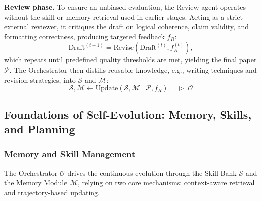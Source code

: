 \documentclass{opendatalab}
\begin{document}
\noindent\textbf{Review phase.}
To ensure an unbiased evaluation, the Review agent operates without the skill or memory retrieval used in earlier stages. Acting as a strict external reviewer, it critiques the draft on logical coherence, claim validity, and formatting correctness, producing targeted feedback $f_R$:
\begin{equation}
    \text{Draft}^{(t+1)} = \text{Revise}(\text{Draft}^{(t)}, f_R^{(t)}),
\end{equation}
which repeats until predefined quality thresholds are met, yielding the final paper $\mathcal{P}$. The Orchestrator then distills reusable knowledge, e.g., writing techniques and revision strategies, into $\mathcal{S}$ and $\mathcal{M}$:
\begin{equation}
    \mathcal{S}, \mathcal{M} \leftarrow \text{Update}(\mathcal{S}, \mathcal{M} \mid \mathcal{P}, f_R). \quad \triangleright\;\mathcal{O}
\end{equation}


\subsection{Foundations of Self-Evolution: Memory, Skills, and Planning}

\subsubsection{Memory and Skill Management}
The Orchestrator $\mathcal{O}$ drives the continuous evolution through the Skill Bank $\mathcal{S}$ and the Memory Module $\mathcal{M}$, relying on two core mechanisms: context-aware retrieval and trajectory-based updating.
\end{document}
